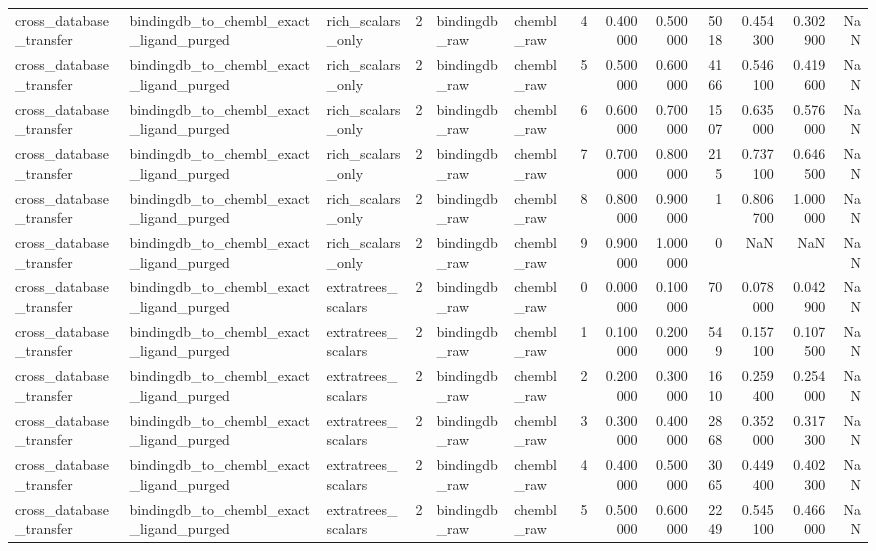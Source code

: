 \begin{longtable}{lllrllrrrrrrr}
cross\_database\_transfer & bindingdb\_to\_chembl\_exact\_ligand\_purged & rich\_scalars\_only & 2 & bindingdb\_raw & chembl\_raw & 4 & 0.400000 & 0.500000 & 5018 & 0.454300 & 0.302900 & NaN \\
cross\_database\_transfer & bindingdb\_to\_chembl\_exact\_ligand\_purged & rich\_scalars\_only & 2 & bindingdb\_raw & chembl\_raw & 5 & 0.500000 & 0.600000 & 4166 & 0.546100 & 0.419600 & NaN \\
cross\_database\_transfer & bindingdb\_to\_chembl\_exact\_ligand\_purged & rich\_scalars\_only & 2 & bindingdb\_raw & chembl\_raw & 6 & 0.600000 & 0.700000 & 1507 & 0.635000 & 0.576000 & NaN \\
cross\_database\_transfer & bindingdb\_to\_chembl\_exact\_ligand\_purged & rich\_scalars\_only & 2 & bindingdb\_raw & chembl\_raw & 7 & 0.700000 & 0.800000 & 215 & 0.737100 & 0.646500 & NaN \\
cross\_database\_transfer & bindingdb\_to\_chembl\_exact\_ligand\_purged & rich\_scalars\_only & 2 & bindingdb\_raw & chembl\_raw & 8 & 0.800000 & 0.900000 & 1 & 0.806700 & 1.000000 & NaN \\
cross\_database\_transfer & bindingdb\_to\_chembl\_exact\_ligand\_purged & rich\_scalars\_only & 2 & bindingdb\_raw & chembl\_raw & 9 & 0.900000 & 1.000000 & 0 & NaN & NaN & NaN \\
cross\_database\_transfer & bindingdb\_to\_chembl\_exact\_ligand\_purged & extratrees\_scalars & 2 & bindingdb\_raw & chembl\_raw & 0 & 0.000000 & 0.100000 & 70 & 0.078000 & 0.042900 & NaN \\
cross\_database\_transfer & bindingdb\_to\_chembl\_exact\_ligand\_purged & extratrees\_scalars & 2 & bindingdb\_raw & chembl\_raw & 1 & 0.100000 & 0.200000 & 549 & 0.157100 & 0.107500 & NaN \\
cross\_database\_transfer & bindingdb\_to\_chembl\_exact\_ligand\_purged & extratrees\_scalars & 2 & bindingdb\_raw & chembl\_raw & 2 & 0.200000 & 0.300000 & 1610 & 0.259400 & 0.254000 & NaN \\
cross\_database\_transfer & bindingdb\_to\_chembl\_exact\_ligand\_purged & extratrees\_scalars & 2 & bindingdb\_raw & chembl\_raw & 3 & 0.300000 & 0.400000 & 2868 & 0.352000 & 0.317300 & NaN \\
cross\_database\_transfer & bindingdb\_to\_chembl\_exact\_ligand\_purged & extratrees\_scalars & 2 & bindingdb\_raw & chembl\_raw & 4 & 0.400000 & 0.500000 & 3065 & 0.449400 & 0.402300 & NaN \\
cross\_database\_transfer & bindingdb\_to\_chembl\_exact\_ligand\_purged & extratrees\_scalars & 2 & bindingdb\_raw & chembl\_raw & 5 & 0.500000 & 0.600000 & 2249 & 0.545100 & 0.466000 & NaN \\

\end{longtable}
